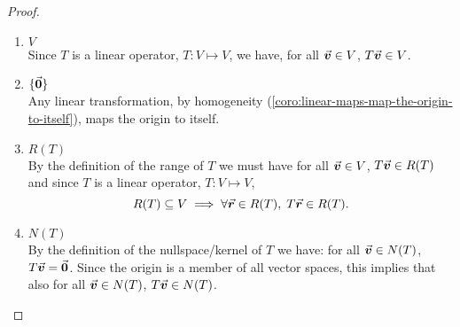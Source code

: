 \documentclass[../MathsNotesBase.tex]{subfiles}
\begin{document}
{		\bigskip
		\begin{tcolorbox}[breakable,enhanced jigsaw,colframe=white,colback=white,boxrule=0pt,arc=0pt,left=0pt,right=0pt,top=0pt,bottom=0pt]
			\begin{proof}$ $
				\begin{enumerate}[label=(\roman*)]
					\item{$V$}\\
						Since $T$ is a linear operator, ${ T: V \longmapsto V }$, we have, for all ${ \vec{\bm{v}} \in V }$, ${ T\vec{\bm{v}} \in V }$.
					\item{$ \{ \vec{\bm{0}} \} $}\\
						Any linear transformation, by homogeneity (\autoref{coro:linear-maps-map-the-origin-to-itself}), maps the origin to itself.
					\item{$R(T)$}\\
						By the definition of the range of $T$ we must have for all ${ \vec{\bm{v}} \in V }$, ${ T\vec{\bm{v}} \in R(T) }$ and since $T$ is a linear operator, ${ T: V \longmapsto V }$, 
						\[ R(T) \subseteq V \implies \forall \vec{\bm{r}} \in R(T), \; T\vec{\bm{r}} \in R(T). \]
					\item{$N(T)$}\\
						By the definition of the nullspace/kernel of $T$ we have: for all ${ \vec{\bm{v}} \in N(T) }$, ${ T\vec{\bm{v}} = \vec{\bm{0}} }$. Since the origin is a member of all vector spaces, this implies that also for all ${ \vec{\bm{v}} \in N(T) }$, ${ T\vec{\bm{v}} \in N(T) }$.
				\end{enumerate}
			\end{proof}
		\end{tcolorbox}
	
}
\end{document}
